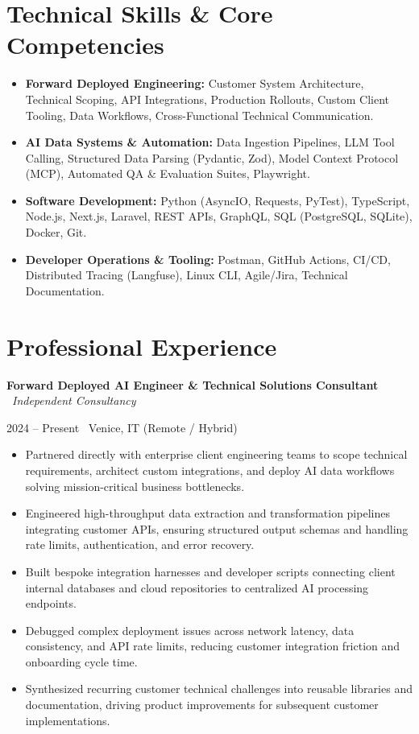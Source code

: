 \documentclass[a4paper,10pt]{article}
\newcommand{\role}[4]{%
  \vspace{2pt}\noindent
  \begin{minipage}[t]{0.70\textwidth}\raggedright\textbf{#1} \textbullet\ \textit{#3}\end{minipage}%
  \hfill
  \begin{minipage}[t]{0.28\textwidth}\raggedleft\footnotesize\color{gray}#2 \textbullet\ #4\end{minipage}%
  \vspace{1pt}%
}
\begin{document}
\section{Technical Skills \& Core Competencies}
\begin{itemize}[leftmargin=1.2em, itemsep=2pt]
  \item \textbf{Forward Deployed Engineering:} Customer System Architecture, Technical Scoping, API Integrations, Production Rollouts, Custom Client Tooling, Data Workflows, Cross-Functional Technical Communication.
  \item \textbf{AI Data Systems \& Automation:} Data Ingestion Pipelines, LLM Tool Calling, Structured Data Parsing (Pydantic, Zod), Model Context Protocol (MCP), Automated QA \& Evaluation Suites, Playwright.
  \item \textbf{Software Development:} Python (AsyncIO, Requests, PyTest), TypeScript, Node.js, Next.js, Laravel, REST APIs, GraphQL, SQL (PostgreSQL, SQLite), Docker, Git.
  \item \textbf{Developer Operations \& Tooling:} Postman, GitHub Actions, CI/CD, Distributed Tracing (Langfuse), Linux CLI, Agile/Jira, Technical Documentation.
\end{itemize}

\section{Professional Experience}

\role{Forward Deployed AI Engineer \& Technical Solutions Consultant}{2024 -- Present}{Independent Consultancy}{Venice, IT (Remote / Hybrid)}
\begin{itemize}
  \item Partnered directly with enterprise client engineering teams to scope technical requirements, architect custom integrations, and deploy AI data workflows solving mission-critical business bottlenecks.
  \item Engineered high-throughput data extraction and transformation pipelines integrating customer APIs, ensuring structured output schemas and handling rate limits, authentication, and error recovery.
  \item Built bespoke integration harnesses and developer scripts connecting client internal databases and cloud repositories to centralized AI processing endpoints.
  \item Debugged complex deployment issues across network latency, data consistency, and API rate limits, reducing customer integration friction and onboarding cycle time.
  \item Synthesized recurring customer technical challenges into reusable libraries and documentation, driving product improvements for subsequent customer implementations.
\end{itemize}
\end{document}
